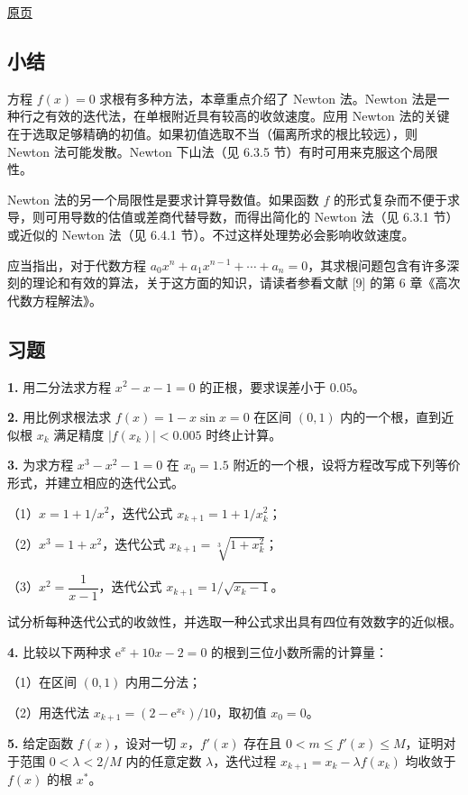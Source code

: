 \documentclass[
  10pt,
  fontset=fandol]{ctexart}
\begin{document}
\href{../../source-images/pdf-175.jpeg}{原页}

\subsection{小结}\label{ux5c0fux7ed3}

方程 \(f(x)=0\) 求根有多种方法，本章重点介绍了 Newton 法。Newton 法是一种行之有效的迭代法，在单根附近具有较高的收敛速度。应用 Newton 法的关键在于选取足够精确的初值。如果初值选取不当（偏离所求的根比较远），则 Newton 法可能发散。Newton 下山法（见 6.3.5 节）有时可用来克服这个局限性。

Newton 法的另一个局限性是要求计算导数值。如果函数 \(f\) 的形式复杂而不便于求导，则可用导数的估值或差商代替导数，而得出简化的 Newton 法（见 6.3.1 节）或近似的 Newton 法（见 6.4.1 节）。不过这样处理势必会影响收敛速度。

应当指出，对于代数方程 \(a_0x^n+a_1x^{n-1}+\cdots+a_n=0\)，其求根问题包含有许多深刻的理论和有效的算法，关于这方面的知识，请读者参看文献 {[}9{]} 的第 6 章《高次代数方程解法》。

\subsection{习题}\label{ux4e60ux9898}

\textbf{1.} 用二分法求方程 \(x^2-x-1=0\) 的正根，要求误差小于 \(0.05\)。

\textbf{2.} 用比例求根法求 \(f(x)=1-x\sin x=0\) 在区间 \((0,1)\) 内的一个根，直到近似根 \(x_k\) 满足精度 \(|f(x_k)|<0.005\) 时终止计算。

\textbf{3.} 为求方程 \(x^3-x^2-1=0\) 在 \(x_0=1.5\) 附近的一个根，设将方程改写成下列等价形式，并建立相应的迭代公式。

（1）\(x=1+1/x^2\)，迭代公式 \(x_{k+1}=1+1/x_k^2\)；

（2）\(x^3=1+x^2\)，迭代公式 \(x_{k+1}=\sqrt[3]{1+x_k^2}\)；

（3）\(x^2=\dfrac{1}{x-1}\)，迭代公式 \(x_{k+1}=1/\sqrt{x_k-1}\)。

试分析每种迭代公式的收敛性，并选取一种公式求出具有四位有效数字的近似根。

\textbf{4.} 比较以下两种求 \(\mathrm{e}^x+10x-2=0\) 的根到三位小数所需的计算量：

（1）在区间 \((0,1)\) 内用二分法；

（2）用迭代法 \(x_{k+1}=(2-\mathrm{e}^{x_k})/10\)，取初值 \(x_0=0\)。

\textbf{5.} 给定函数 \(f(x)\)，设对一切 \(x\)，\(f'(x)\) 存在且 \(0<m\leqslant f'(x)\leqslant M\)，证明对于范围 \(0<\lambda<2/M\) 内的任意定数 \(\lambda\)，迭代过程 \(x_{k+1}=x_k-\lambda f(x_k)\) 均收敛于 \(f(x)\) 的根 \(x^*\)。
\end{document}
